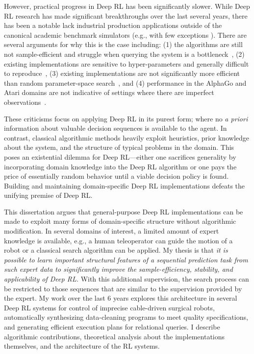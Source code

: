 However, practical progress in Deep RL has been significantly slower. 
While Deep RL research has made significant breakthroughs over the last several years, there has been a notable lack industrial production applications outside of the canonical academic benchmark simulators (e.g., with few exceptions \cite{mirhoseini2017device}). 
There are several arguments for why this is the case including: (1) the algorithms are still not sample-efficient and struggle when querying the system is a bottleneck~\cite{sunderhauf2018limits, stoica2017berkeley}, (2) existing implementations are sensitive to hyper-parameters and generally difficult to reproduce~\cite{islam2017reproducibility, henderson2017deep}, (3) existing implementations are not significantly more efficient than random parameter-space search~\cite{mania2018simple, salimans2017evolution}, and (4) performance in the AlphaGo and Atari domains are not indicative of settings where there are imperfect observations~\cite{stoica2017berkeley, sunderhauf2018limits}.

These criticisms focus on applying Deep RL in its purest form; where no \emph{a priori} information about valuable decision sequences is available to the agent.
In contrast, classical algorithmic methods heavily exploit heuristics, prior knowledge about the system, and the structure of typical problems in the domain.
This poses an existential dilemma for Deep RL---either one sacrifices generality by incorporating domain knowledge into the Deep RL algorithm or one pays the price of essentially random behavior until a viable decision policy is found. Building and maintaining domain-specific Deep RL implementations defeats the unifying premise of Deep RL.

This dissertation argues that general-purpose Deep RL implementations can be made to exploit many forms of domain-specific structure without algorithmic modification. In several domains of interest, a limited amount of expert knowledge is available, e.g., a human teleoperator can guide the motion of a robot or a classical search algorithm can be applied. 
My thesis is that \emph{it is possible to learn important structural features of a sequential prediction task from such expert data to significantly improve the sample-efficiency, stability, and applicability of Deep RL.} 
With this additional supervision, the search process can be restricted to those sequences that are similar to the supervision provided by the expert.
My work over the last 6 years explores this architecture in several Deep RL systems for control of imprecise cable-driven surgical robots, automatically synthesizing data-cleaning programs to meet quality specifications, and generating efficient execution plans for relational queries. I describe algorithmic contributions, theoretical analysis about the implementations themselves, and the architecture of the RL systems.


